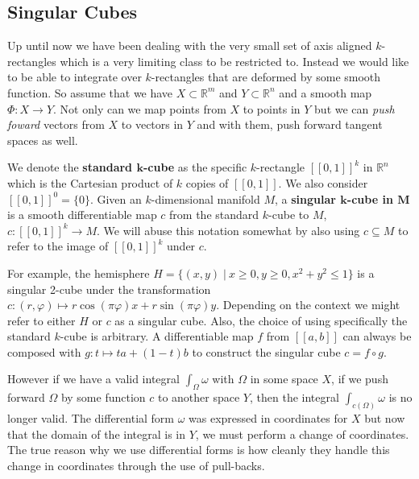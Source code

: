 \subsection{Singular Cubes}

Up until now we have been dealing with the very small set of axis aligned $k$-rectangles 
which is a very limiting class to be restricted to.
Instead we would like to be able to integrate over $k$-rectangles that are deformed by some smooth function.
So assume that we have $X \subset \mathbb{R}^m$ and $Y \subset \mathbb{R}^n$ and a smooth map 
 $\varPhi : X \to Y$.
Not only can we map points from $X$ to points in $Y$ but we can \emph{push foward} vectors from $X$ to vectors in $Y$
and with them, push forward tangent spaces as well.


\begin{definition}
	We denote the \textbf{standard $\boldsymbol{k}$-cube} as the specific $k$-rectangle $[\![0,1]\!]^k$ in 	
	$\mathbb{R}^n$ which is the Cartesian product of $k$ copies of $[\![0,1]\!]$.
	We also consider $[\![0,1]\!]^0 = \{0\}$.
	Given an $k$-dimensional manifold $M$, a \textbf{singular $\boldsymbol{k}$-cube in $\boldsymbol{M}$} is a 
	smooth differentiable map $c$ from the standard $k$-cube to $M$, $c:[\![0,1]\!]^k \to M$.
	We will abuse this notation somewhat by also using $c \subseteq M$ to refer to the image of $[\![0,1]\!]^k$ under $c$.
\end{definition}

For example, the hemisphere $H = \{ (x,y) \; | \: x \geq 0, y\geq 0, x^2+y^2 \leq 1 \}$
is a singular 2-cube under the transformation $c: (r, \varphi) \mapsto r \cos(\pi \varphi) x+ r \sin(\pi \varphi) y$.
Depending on the context we might refer to either $H$ or $c$ as a singular cube.
Also, the choice of using specifically the standard $k$-cube is arbitrary.
A differentiable map $f$ from $[\![a,b]\!]$ can always be composed with $g:t \mapsto ta +(1-t)b$ 
to construct the singular cube $c=f \circ g$.



However if we have a valid integral $\int_{\Omega} \omega$ with $\Omega$ in some space $X$, 
if we push forward $\Omega$ by some function $c$ to another space $Y$, 
then the integral $\int_{c(\Omega)} \omega$ is no longer valid.
The differential form $\omega$ was expressed in coordinates for $X$ but now that the domain of the integral is in $Y$,
we must perform a change of coordinates.
The true reason why we use differential forms is how cleanly they handle this change in coordinates 
through the use of pull-backs.

